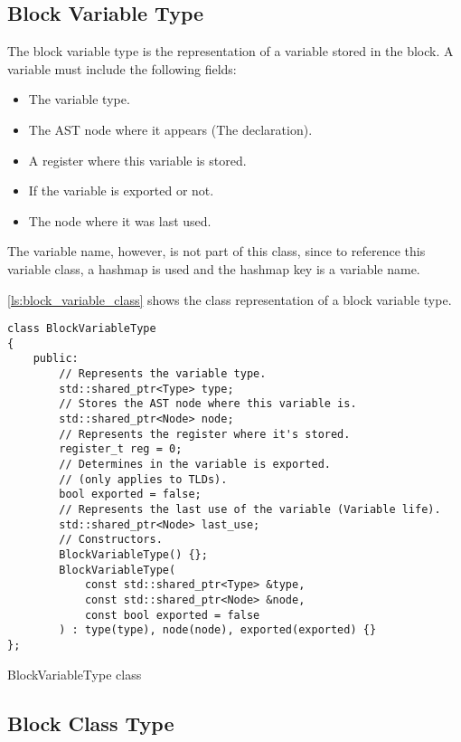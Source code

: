\subsection{Block Variable Type}

The block variable type is the representation of a variable stored in the block. A variable must include the following fields:

\begin{itemize}
    \item The variable type.
    \item The AST node where it appears (The declaration).
    \item A register where this variable is stored.
    \item If the variable is exported or not.
    \item The node where it was last used.
\end{itemize}

The variable name, however, is not part of this class, since to reference this variable class, a hashmap is used and the hashmap key is a variable name.

\autoref{ls:block_variable_class} shows the class representation of a block variable type.

\begin{listing}[H]
\begin{verbatim}
class BlockVariableType
{
    public:
        // Represents the variable type.
        std::shared_ptr<Type> type;
        // Stores the AST node where this variable is.
        std::shared_ptr<Node> node;
        // Represents the register where it's stored.
        register_t reg = 0;
        // Determines in the variable is exported.
        // (only applies to TLDs).
        bool exported = false;
        // Represents the last use of the variable (Variable life).
        std::shared_ptr<Node> last_use;
        // Constructors.
        BlockVariableType() {};
        BlockVariableType(
            const std::shared_ptr<Type> &type,
            const std::shared_ptr<Node> &node,
            const bool exported = false
        ) : type(type), node(node), exported(exported) {}
};
\end{verbatim}
\caption{BlockVariableType class}
\label{ls:block_variable_class}
\end{listing}

\subsection{Block Class Type}


